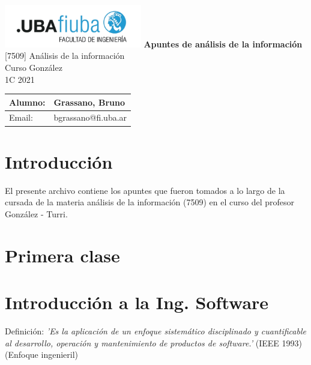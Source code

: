 \documentclass[titlepage,a4paper]{article}
\begin{document}
\begin{titlepage} %
	\hfill\includegraphics[width=6cm]{logofiuba.jpg}
    \centering
    \vfill
    \Huge \textbf{Apuntes de análisis de la información}
    \vskip2cm
    \Large [7509] Análisis de la información\\
    Curso González \\
    1C 2021 
    \vfill
    \begin{tabular}{ | l | l | }
      \hline
      Alumno: & Grassano, Bruno \\ \hline
      Email: & bgrassano@fi.uba.ar \\ \hline
  	\end{tabular}
    \vfill
    \vfill
\end{titlepage}

\tableofcontents %

\newpage

\section{Introducción}\label{sec:intro}
El presente archivo contiene los apuntes que fueron tomados a lo largo de la cursada de la materia análisis de la información (7509) en el curso del profesor González - Turri.



\section*{Primera clase}
\section{Introducción a la Ing. Software}
Definición: \textit{'Es la aplicación de un enfoque sistemático disciplinado y cuantificable al desarrollo, operación y mantenimiento de productos de software.'} (IEEE 1993) (Enfoque ingenieril)

\medskip
\end{document}
